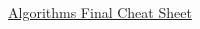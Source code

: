 \documentclass[landscape,twoside]{article}%
\begin{document}
\raggedright
\begin{multicols}{3}
\setlength{\premulticols}{1pt}
\setlength{\postmulticols}{1pt}
\setlength{\multicolsep}{1pt}
\setlength{\columnsep}{2pt}

\begin{center}
     \Large{\underline{Algorithms Final Cheat Sheet}} \\
\end{center}





\end{multicols}
\end{document}
